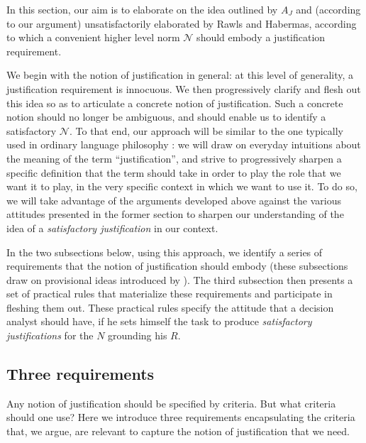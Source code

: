 \documentclass[preprint, french, english, 11pt, authoryear]{elsarticle}%
\newcommand{\adv}{\mathscr{N}}
\begin{document}
In this section, our aim is to elaborate on the idea outlined by $A_J$ and (according to our argument) unsatisfactorily elaborated by Rawls and Habermas, according to which a convenient higher level norm $\adv$ should embody a justification requirement.

We begin with the notion of justification in general: at this level of generality, a justification requirement is innocuous. 
We then progressively clarify and flesh out this idea so as to articulate a concrete notion of justification. Such a concrete notion should no longer be ambiguous, and should enable us to identify a satisfactory $\adv$. 
To that end, our approach will be similar to the one typically used in ordinary language philosophy \citep{soames_philosophical_2003}: 
we will draw on everyday intuitions about the meaning of the term ``justification'', and strive to progressively sharpen a specific definition that the term should take in order to play the role that we want it to play, in the very specific context in which we want to use it. 
To do so, we will take advantage of the arguments developed above against the various attitudes presented in the former section to sharpen our understanding of the idea of a \emph{satisfactory justification} in our context.

In the two subsections below, using this approach, we identify a series of requirements that the notion of justification should embody (these subsections draw on provisional ideas introduced by \citet{meinard_du_2013, meinard_what_2017}). 
The third subsection then presents a set of practical rules that materialize these requirements and participate in fleshing them out. These practical rules specify the attitude that a decision analyst should have, if he sets himself the task to produce \emph{satisfactory justifications} for the $N$ grounding his $R$.

\subsection{Three requirements}
Any notion of justification should be specified by criteria. But what criteria should one use? Here we introduce three requirements encapsulating the criteria that, we argue, are relevant to capture the notion of justification that we need.
\end{document}
